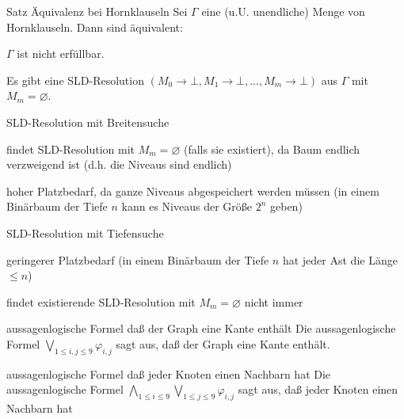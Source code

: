 \documentclass[avery5371]{flashcards}
\begin{document}
\begin{flashcard}[ Erfüllbarkeit ]{ Satz Äquivalenz bei Hornklauseln }
    Sei $\Gamma$ eine (u.U. unendliche) Menge von Hornklauseln. Dann sind äquivalent:
    \begin{enumerate*}
        \item $\Gamma$ ist nicht erfüllbar.
        \item Es gibt eine SLD-Resolution $(M_0\rightarrow\bot,M_1\rightarrow\bot,... ,M_m\rightarrow\bot)$ aus $\Gamma$ mit $M_m=\varnothing$.
    \end{enumerate*}
\end{flashcard}

\begin{flashcard}[ Erfüllbarkeit ]{ SLD-Resolution mit Breitensuche }
    \begin{itemize*}
        \item findet SLD-Resolution mit $M_m=\varnothing$ (falls sie existiert), da Baum endlich verzweigend ist (d.h. die Niveaus sind endlich)
        \item hoher Platzbedarf, da ganze Niveaus abgespeichert werden müssen (in einem Binärbaum der Tiefe $n$ kann es Niveaus der Größe $2^n$ geben)
    \end{itemize*}
\end{flashcard}

\begin{flashcard}[ Erfüllbarkeit ]{ SLD-Resolution mit Tiefensuche }
    \begin{itemize*}
        \item geringerer Platzbedarf (in einem Binärbaum der Tiefe $n$ hat jeder Ast die Länge $\leq n$)
        \item findet existierende SLD-Resolution mit $M_m=\varnothing$ nicht immer
    \end{itemize*}
\end{flashcard}

\begin{flashcard}[ Prädikatenlogik ]{ aussagenlogische Formel daß der Graph eine Kante enthält }
    Die aussagenlogische Formel $\bigvee_{1\leq i,j\leq 9} \varphi_{i,j}$ sagt aus, daß der Graph eine Kante enthält.
\end{flashcard}

\begin{flashcard}[ Prädikatenlogik ]{ aussagenlogische Formel daß jeder Knoten einen Nachbarn hat }
    Die aussagenlogische Formel $\bigwedge_{1\leq i\leq 9} \bigvee_{1\leq j\leq 9} \varphi_{i,j}$ sagt aus, daß jeder Knoten einen Nachbarn hat
\end{flashcard}
\end{document}
